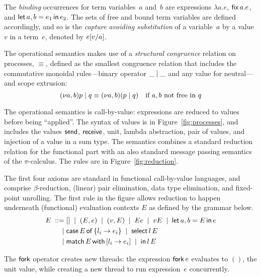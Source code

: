 
The \emph{binding} occurrences for term variables~$a$ and~$b$ are
expressions $\lambda a.e$, $\mathsf{fix}\,a.e$, and $\mathsf{let}\,{a,b}={e_1}\,\mathsf{in}\,{e_2}$.
The sets of free and bound
term variables are defined accordingly, and so is the
\emph{capture avoiding substitution} of a variable~$a$ by a value~$v$ in a term~$e$,
denoted by $e[{v}/{a}]$.

The operational semantics makes use of a \emph{structural congruence}
relation on processes, $\equiv$, defined as the smallest congruence
relation that includes the commutative monoidal rules---binary
operator $\_\mid\_$ and any value for neutral---and scope extrusion:
%
\begin{equation*}
  (\nu a,b)p \mid q \equiv (\nu a,b)(p\mid q) \quad\text{if $a,b$ not free
    in $q$}
\end{equation*}


The operational semantics is call-by-value: expressions are reduced to
values before being ``applied''. The syntax of values is in
Figure~\ref{fig:processes}, and includes the values $\mathsf{send}$,
$\mathsf{receive}$, unit, lambda abstraction, pair of values, and injection of a
value in a sum type. The semantics combines a standard reduction
relation for the functional part with an also standard message passing
semantics of the $\pi$-calculus.
%
The rules are in Figure~\ref{fig:reduction}.



The first four axioms are standard in functional call-by-value languages,
and comprise $\beta$-reduction, (linear) pair elimination, data type
elimination, and fixed-point unrolling.
%
The first rule in the figure allows reduction to happen underneath
(functional) evaluation contexts $E$ as defined by the grammar
below.
%
\begin{align*}
  E \; ::= \;& [] \;\mid\; (E,e) \;\mid\; (v,E) \;\mid\; Ee \;\mid\; vE \;\mid\; \mathsf{let}\,{a,b}={E}\,\mathsf{in}\,{e}
  \\
  \;\mid\;& \mathsf{case}\,E\,\mathsf{of}\,\{l_i\rightarrow e_i\} \;\mid\; \mathsf{select}\,l\,E
  \\
  \;\mid\;& \mathsf{match}\,{E}\,\mathsf{with}\,[{l_i\rightarrow e_i}] \;\mid\; \mathsf{in}\,l\,E
\end{align*}

The $\mathsf{fork}$ operator creates new threads: the expression $\mathsf{fork}\,{e}$
evaluates to $()$, the unit value, while creating a new thread to run
expression~$e$ concurrently.

